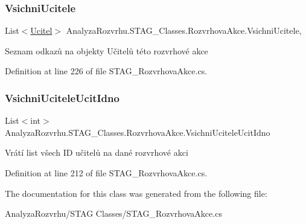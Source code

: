 \subsubsection{\texorpdfstring{Vsichni\+Ucitele}{VsichniUcitele}}
{\footnotesize\ttfamily List$<$\hyperlink{class_analyza_rozvrhu_1_1_s_t_a_g___classes_1_1_ucitel}{Ucitel}$>$ Analyza\+Rozvrhu.\+S\+T\+A\+G\+\_\+\+Classes.\+Rozvrhova\+Akce.\+Vsichni\+Ucitele\hspace{0.3cm}{\ttfamily [get]}, {\ttfamily [set]}}



Seznam odkazů na objekty Učitelů této rozvrhové akce 



Definition at line 226 of file S\+T\+A\+G\+\_\+\+Rozvrhova\+Akce.\+cs.

\mbox{\label{class_analyza_rozvrhu_1_1_s_t_a_g___classes_1_1_rozvrhova_akce_a0389a640bde212d0f5146f69ff8acd72}} 
\subsubsection{\texorpdfstring{Vsichni\+Ucitele\+Ucit\+Idno}{VsichniUciteleUcitIdno}}
{\footnotesize\ttfamily List$<$int$>$ Analyza\+Rozvrhu.\+S\+T\+A\+G\+\_\+\+Classes.\+Rozvrhova\+Akce.\+Vsichni\+Ucitele\+Ucit\+Idno\hspace{0.3cm}{\ttfamily [get]}}



Vrátí list všech ID učitelů na dané rozvrhové akci 



Definition at line 212 of file S\+T\+A\+G\+\_\+\+Rozvrhova\+Akce.\+cs.



The documentation for this class was generated from the following file\+:\begin{DoxyCompactItemize}
\item 
Analyza\+Rozvrhu/\+S\+T\+A\+G Classes/S\+T\+A\+G\+\_\+\+Rozvrhova\+Akce.\+cs\end{DoxyCompactItemize}
